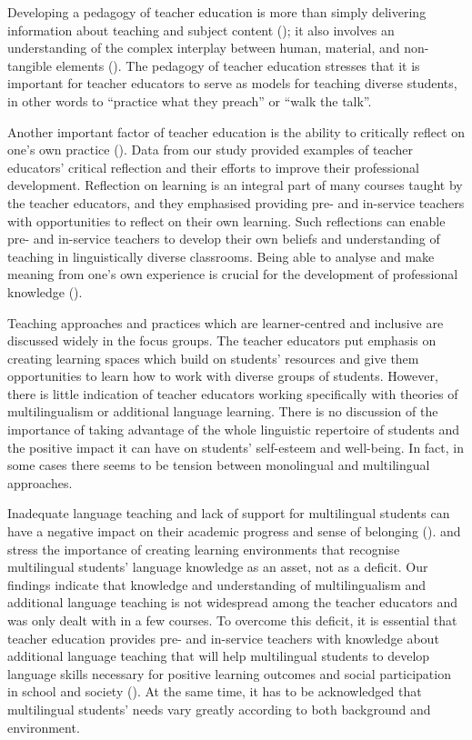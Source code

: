 \documentclass[output=paper]{langscibook}
\begin{document}
\begin{sloppypar}
Developing a pedagogy of teacher education is more than simply delivering information about teaching and subject content (\citealt{Loughran2005}); it also involves an understanding of the complex interplay between human, material, and non-tangible elements (\citealt{HordvikEtAl2020}). The pedagogy of teacher education stresses that it is important for teacher educators to serve as models for teaching diverse students, in other words to “practice what they preach” or “walk the talk”.
\end{sloppypar}

{Another important factor of teacher education is the ability to critically reflect on one’s own practice} (\citealt{Loughran2002,WattsLawson2009}){. Data from our study provided examples of teacher educators’ critical reflection and their efforts to improve their professional development. Reflection on learning is an integral part of many courses taught by the teacher educators, and they emphasised providing pre- and} in-service teachers{ with opportunities to reflect on their own learning. Such reflections can enable pre- and} in-service teachers{ to develop their own beliefs and understanding of teaching in linguistically diverse classrooms. Being able to analyse and make meaning from one's own experience is crucial for the development of professional knowledge} (\citealt{RussellMartin2017}){.}

Teaching approaches and practices which are learner-centred and inclusive are discussed widely in the focus groups. The teacher educators put emphasis on creating learning spaces which build on students’ resources and give them opportunities to learn how to work with diverse groups of students. However, there is little indication of teacher educators working specifically with theories of multilingualism or additional language learning. {There is no discussion of the importance of} taking advantage of the whole linguistic repertoire of students and the positive impact it can have on students’ self-esteem and well-being. In fact, in some cases there seems to be tension between monolingual and multilingual approaches.

Inadequate language teaching and lack of support for multilingual students can have a negative impact on their academic progress and sense of belonging (\citealt{SinacoreLerner2013}). \citet{CumminsEarly2015} and \citet{LucasEtAl2008} stress the importance of creating learning environments that recognise multilingual students’ language knowledge as an asset, not as a deficit. Our findings indicate that knowledge and understanding of multilingualism and additional language teaching is not widespread among the teacher educators and was only dealt with in a few courses. To overcome this deficit, it is essential that teacher education provides pre- and in-service teachers with knowledge about additional language teaching that will help multilingual students to develop language skills necessary for positive learning outcomes and social participation in school and society (\citealt{LucasEtAl2008}). At the same time, it has to be acknowledged that multilingual students’ needs vary greatly according to both background and environment.
\end{document}

